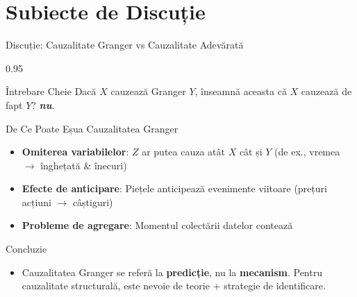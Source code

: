 \documentclass[9pt, aspectratio=169, t]{beamer}
\begin{document}
\section{Subiecte de Discuție}

\begin{frame}{Discuție: Cauzalitate Granger vs Cauzalitate Adevărată}
    \begin{cminipage}{0.95\textwidth}
    {\small
    \begin{alertblock}{Întrebare Cheie}
        Dacă $X$ cauzează Granger $Y$, înseamnă aceasta că $X$ cauzează de fapt $Y$? \textbf{\emph{nu}}.
    \end{alertblock}
    \begin{block}{De Ce Poate Eșua Cauzalitatea Granger}
        \begin{itemize}\setlength{\itemsep}{0pt}
            \item \textbf{Omiterea variabilelor}: $Z$ ar putea cauza atât $X$ cât și $Y$ (de ex., vremea $\to$ înghețată \& înecuri)
            \item \textbf{Efecte de anticipare}: Piețele anticipează evenimente viitoare (prețuri acțiuni $\to$ câștiguri)
            \item \textbf{Probleme de agregare}: Momentul colectării datelor contează
        \end{itemize}
    \end{block}
    \begin{exampleblock}{Concluzie}
        \begin{itemize}\setlength{\itemsep}{0pt}
            \item Cauzalitatea Granger se referă la \textbf{predicție}, nu la \textbf{mecanism}. Pentru cauzalitate structurală, este nevoie de teorie + strategie de identificare.
        \end{itemize}
    \end{exampleblock}
    }
    \end{cminipage}
\end{frame}
\end{document}
